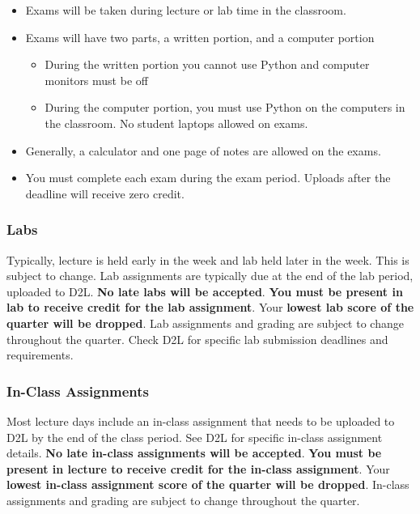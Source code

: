 \documentclass[11pt]{article}
\providecommand{\tightlist}{%
      \setlength{\itemsep}{0pt}\setlength{\parskip}{0pt}}
\begin{document}
\begin{itemize}
\tightlist
\item
  Exams will be taken during lecture or lab time in the classroom.
\item
  Exams will have two parts, a written portion, and a computer portion

  \begin{itemize}
  \tightlist
  \item
    During the written portion you cannot use Python and computer
    monitors must be off
  \item
    During the computer portion, you must use Python on the computers in
    the classroom. No student laptops allowed on exams.
  \end{itemize}
\item
  Generally, a calculator and one page of notes are allowed on the
  exams.
\item
  You must complete each exam during the exam period. Uploads after the
  deadline will receive zero credit.
\end{itemize}

    \hypertarget{labs}{%
\subsubsection{Labs}\label{labs}}

Typically, lecture is held early in the week and lab held later in the
week. This is subject to change. Lab assignments are typically due at
the end of the lab period, uploaded to D2L. \textbf{No late labs will be
accepted}. \textbf{You must be present in lab to receive credit for the
lab assignment}. Your \textbf{lowest lab score of the quarter will be
dropped}. Lab assignments and grading are subject to change throughout
the quarter. Check D2L for specific lab submission deadlines and
requirements.

    \hypertarget{in-class-assignments}{%
\subsubsection{In-Class Assignments}\label{in-class-assignments}}

Most lecture days include an in-class assignment that needs to be
uploaded to D2L by the end of the class period. See D2L for specific
in-class assignment details. \textbf{No late in-class assignments will
be accepted}. \textbf{You must be present in lecture to receive credit
for the in-class assignment}. Your \textbf{lowest in-class assignment
score of the quarter will be dropped}. In-class assignments and grading
are subject to change throughout the quarter.
\end{document}
